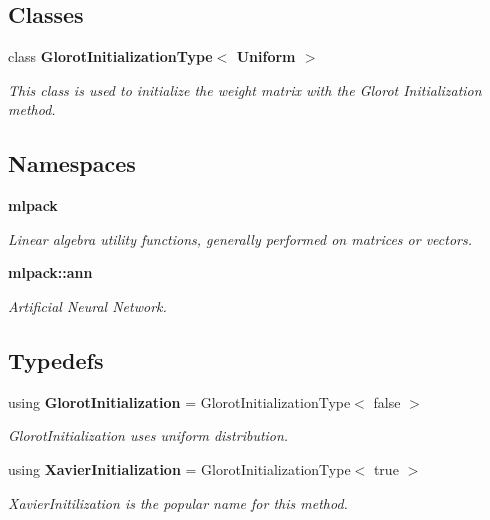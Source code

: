 \subsection*{Classes}
\begin{DoxyCompactItemize}
\item 
class \textbf{ Glorot\+Initialization\+Type$<$ Uniform $>$}
\begin{DoxyCompactList}\small\item\em This class is used to initialize the weight matrix with the Glorot Initialization method. \end{DoxyCompactList}\end{DoxyCompactItemize}
\subsection*{Namespaces}
\begin{DoxyCompactItemize}
\item 
 \textbf{ mlpack}
\begin{DoxyCompactList}\small\item\em Linear algebra utility functions, generally performed on matrices or vectors. \end{DoxyCompactList}\item 
 \textbf{ mlpack\+::ann}
\begin{DoxyCompactList}\small\item\em Artificial Neural Network. \end{DoxyCompactList}\end{DoxyCompactItemize}
\subsection*{Typedefs}
\begin{DoxyCompactItemize}
\item 
using \textbf{ Glorot\+Initialization} = Glorot\+Initialization\+Type$<$ false $>$
\begin{DoxyCompactList}\small\item\em Glorot\+Initialization uses uniform distribution. \end{DoxyCompactList}\item 
using \textbf{ Xavier\+Initialization} = Glorot\+Initialization\+Type$<$ true $>$
\begin{DoxyCompactList}\small\item\em Xavier\+Initilization is the popular name for this method. \end{DoxyCompactList}\end{DoxyCompactItemize}



